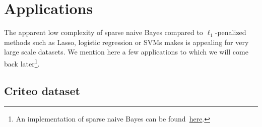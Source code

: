 \section{Applications}\label{sec:nb_app}

The apparent low complexity of sparse naive Bayes compared to $\ell_1$-penalized methods such as
Lasso, logistic regression or SVMs makes is appealing for very large scale datasets.
We mention here a few applications to which we will come back later\footnote{
    An implementation of sparse naive Bayes can be found~\href{https://github.com/aspremon/NaiveFeatureSelection}{here}.
}.

\subsection{Criteo dataset}\label{subsec:snb_criteo}


